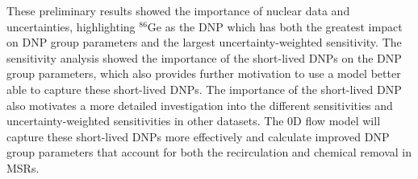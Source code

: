 These preliminary results showed the importance of nuclear data and uncertainties, highlighting $^{86}$Ge as the \gls{DNP} which has both the greatest impact on \gls{DNP} group parameters and the largest uncertainty-weighted sensitivity.
The sensitivity analysis showed the importance of the short-lived \glspl{DNP} on the \gls{DNP} group parameters, which also provides further motivation to use a model better able to capture these short-lived \glspl{DNP}.
The importance of the short-lived \gls{DNP} also motivates a more detailed investigation into the different sensitivities and uncertainty-weighted sensitivities in other datasets.
The 0D flow model will capture these short-lived \glspl{DNP} more effectively and calculate improved \gls{DNP} group parameters that account for both the recirculation and chemical removal in \glspl{MSR}.